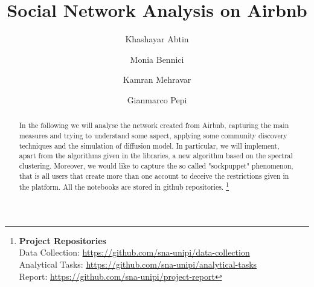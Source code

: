 \documentclass[sigchi]{acmart}
\begin{document}
%
\title{Social Network Analysis on Airbnb}

%
\author{Khashayar Abtin}

\author{Monia Bennici}

\author{Kamran Mehravar}

\author{Gianmarco Pepi}


\renewcommand{\shortauthors}{Abtin, Bennici,Mehravar and Pepi}


\begin{abstract}
 In the following we will analyse the network created from Airbnb, capturing the main measures and trying to understand some aspect, applying some community discovery techniques and the simulation of diffusion model. In particular, we will implement, apart from the algorithms given in the libraries, a new algorithm based on the spectral clustering. Moreover, we would like to capture the so called "sockpuppet" phenomenon, that is all users that create more than one account to deceive the restrictions given in the platform.
All the notebooks are stored in github repositories. \footnote{
{\bf Project Repositories}\\
\noindent Data Collection: \url{https://github.com/sna-unipi/data-collection}\\
\noindent Analytical Tasks: \url{https://github.com/sna-unipi/analytical-tasks}\\
\noindent Report: \url{https://github.com/sna-unipi/project-report}}
\end{abstract}


%
\end{document}
